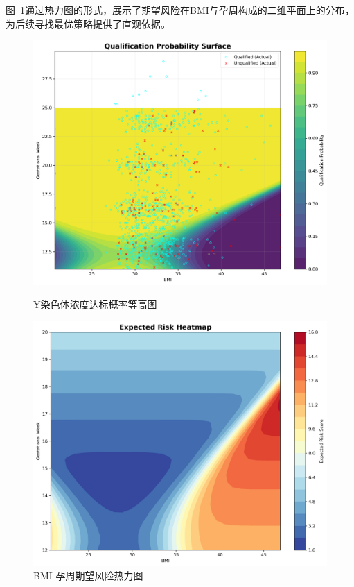 \documentclass[12pt,a4paper]{ctexart}
\numberwithin{equation}{section}
\theoremstyle{mcm}
\begin{document}
图~\ref{fig:expected_risk_heatmap}通过热力图的形式，展示了期望风险在BMI与孕周构成的二维平面上的分布，为后续寻找最优策略提供了直观依据。

\begin{figure}[htbp]
    \centering
    \begin{minipage}{0.48\textwidth}
        \centering
        \includegraphics[width=\textwidth]{q2/qualification_probability_surface.png}
        \caption{Y染色体浓度达标概率等高图}
        \label{fig:qualification_probability}
    \end{minipage}
    \hfill
    \begin{minipage}{0.48\textwidth}
        \centering
        \includegraphics[width=\textwidth]{q2/expected_risk_heatmap.png}
        \caption{BMI-孕周期望风险热力图}
        \label{fig:expected_risk_heatmap}
    \end{minipage}
\end{figure}
\end{document}
